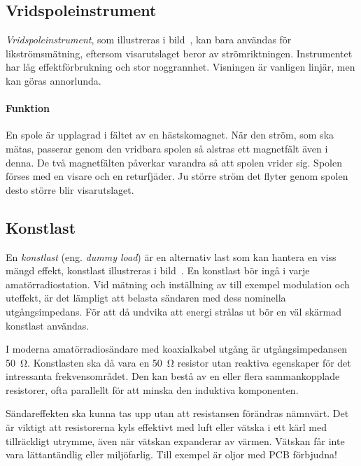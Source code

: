\subsection{Vridspoleinstrument}


\emph{Vridspoleinstrument}, som illustreras i bild~, kan
bara användas för likströmsmätning, eftersom visarutslaget beror av
strömriktningen.
Instrumentet har låg effektförbrukning och stor noggrannhet.
Visningen är vanligen linjär, men kan göras annorlunda.

\paragraph{Funktion}
En spole är upplagrad i fältet av en hästskomagnet.
När den ström, som ska mätas, passerar genom den vridbara spolen så alstras ett
magnetfält även i denna.
De två magnetfälten påverkar varandra så att spolen vrider sig.
Spolen förses med en visare och en returfjäder.
Ju större ström det flyter genom spolen desto större blir visarutslaget.


\subsection{Konstlast}
\label{konstlast}

En \emph{konstlast} (eng. \emph{dummy load}) är en alternativ last som kan
hantera en viss mängd effekt, konstlast illustreras i bild~.
En konstlast bör ingå i varje amatörradiostation.
Vid mätning och inställning av till exempel modulation och uteffekt, är det
lämpligt att belasta sändaren med dess nominella utgångsimpedans.
För att då undvika att energi strålas ut bör en väl skärmad konstlast användas.

I moderna amatörradiosändare med koaxialkabel utgång är utgångsimpedansen
\qty{50}{\ohm}.
Konstlasten ska då vara en \qty{50}{\ohm} resistor utan reaktiva egenskaper för
det intressanta frekvensområdet.
Den kan bestå av en eller flera sammankopplade resistorer, ofta parallellt för
att minska den induktiva komponenten.

Sändareffekten ska kunna tas upp utan att resistansen förändras nämnvärt.
Det är viktigt att resistorerna kyls effektivt med luft eller vätska i ett kärl
med tillräckligt utrymme, även när vätskan expanderar av värmen.
Vätskan får inte vara lättantändlig eller miljöfarlig.
Till exempel är oljor med PCB förbjudna!

